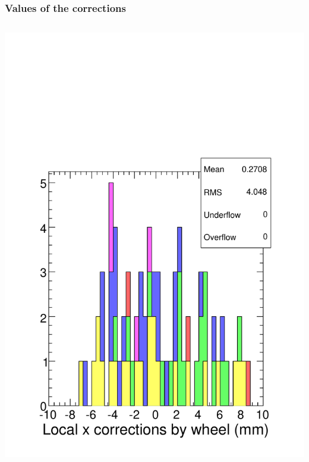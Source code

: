 \documentclass[compress]{beamer}
\begin{document}
\begin{frame}
\frametitle{Values of the corrections}

\begin{columns}
\includegraphics[width=\linewidth]{corrections_x.pdf}


\end{columns}
\end{frame}
\end{document}
